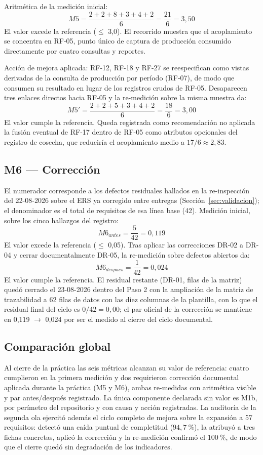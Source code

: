 \noindent Aritmética de la medición inicial:
\[ M5 = \frac{2+2+8+3+4+2}{6} = \frac{21}{6} = 3{,}50 \]
El valor excede la referencia ($\leq$ 3,0). El recorrido muestra que el acoplamiento se concentra en RF-05, punto único de captura de producción consumido directamente por cuatro consultas y reportes.

Acción de mejora aplicada: RF-12, RF-18 y RF-27 se reespecifican como vistas derivadas de la consulta de producción por período (RF-07), de modo que consumen su resultado en lugar de los registros crudos de RF-05. Desaparecen tres enlaces directos hacia RF-05 y la re-medición sobre la misma muestra da:
\[ M5' = \frac{2+2+5+3+4+2}{6} = \frac{18}{6} = 3{,}00 \]
El valor cumple la referencia. Queda registrada como recomendación no aplicada la fusión eventual de RF-17 dentro de RF-05 como atributos opcionales del registro de cosecha, que reduciría el acoplamiento medio a $17/6 \approx 2{,}83$.

\subsection{M6 --- Corrección}
\label{sec:m6-correccion}

El numerador corresponde a los defectos residuales hallados en la re-inspección del 22-08-2026 sobre el ERS ya corregido entre entregas (Sección~\ref{sec:validacion}); el denominador es el total de requisitos de esa línea base (42). Medición inicial, sobre los cinco hallazgos del registro:
\[ M6_{antes} = \frac{5}{42} = 0{,}119 \]
El valor excede la referencia ($\leq$ 0,05). Tras aplicar las correcciones DR-02 a DR-04 y cerrar documentalmente DR-05, la re-medición sobre defectos abiertos da:
\[ M6_{despues} = \frac{1}{42} = 0{,}024 \]
El valor cumple la referencia. El residual restante (DR-01, filas de la matriz) quedó cerrado el 23-08-2026 dentro del Paso 2 con la ampliación de la matriz de trazabilidad a 62 filas de datos con las diez columnas de la plantilla, con lo que el residual final del ciclo es $0/42 = 0{,}00$; el par oficial de la corrección se mantiene en 0,119 $\rightarrow$ 0,024 por ser el medido al cierre del ciclo documental.

\subsection{Comparación global}
\label{sec:comparacion-global}

Al cierre de la práctica las seis métricas alcanzan su valor de referencia: cuatro cumplieron en la primera medición y dos requirieron corrección documental aplicada durante la práctica (M5 y M6), ambas re-medidas con aritmética visible y par antes/después registrado. La única componente declarada sin valor es M1b, por perímetro del repositorio y con causa y acción registradas. La auditoría de la segunda ola ejercitó además el ciclo completo de mejora sobre la expansión a 57 requisitos: detectó una caída puntual de completitud ($94{,}7~\%$), la atribuyó a tres fichas concretas, aplicó la corrección y la re-medición confirmó el $100~\%$, de modo que el cierre quedó sin degradación de los indicadores.
